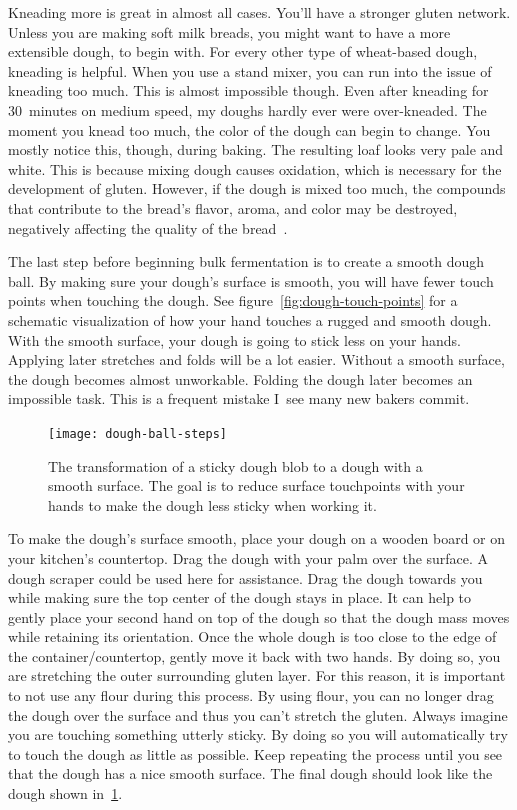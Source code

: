 Kneading more is great in almost all cases. You'll have a stronger
gluten network. Unless you are making soft milk breads, you
might want to have a more extensible dough, to begin with. For every
other type of wheat-based dough, kneading is helpful. When you use
a stand mixer, you can run into the issue of kneading too much. This
is almost impossible though. Even after kneading for 30~minutes on medium
speed, my doughs hardly ever were over-kneaded. The moment you knead
too much, the color of the dough can begin to change. You mostly
notice this, though, during baking. The resulting loaf looks very
pale and white. This is because mixing dough causes oxidation,
which is necessary for the development of gluten.
However, if the dough is mixed too much, the compounds that contribute
to the bread's flavor, aroma, and color may be destroyed, negatively
affecting the quality of the bread~\cite{oxidization+dough}.

The last step before beginning bulk fermentation is to
create a smooth dough ball. By making sure your dough's surface is
smooth, you will have fewer touch points when touching the dough.
See figure~\ref{fig:dough-touch-points} for a schematic visualization
of how your hand touches a rugged and smooth dough.
With the smooth surface, your dough is going to stick less on your hands. Applying
later stretches and folds will be a lot easier. Without a smooth
surface, the dough becomes almost unworkable. Folding the dough later
becomes an impossible task. This is a frequent mistake I~see many
new bakers commit.

\begin{figure}[!htb]
  \texttt{[image: dough-ball-steps]}
  \caption[Creating a smooth surface]{The transformation of a sticky dough
      blob to a dough with a smooth surface. The goal is to reduce surface
      touchpoints with your hands to make the dough less sticky when working
      it.}%
  \label{fig:dough-ball-steps}
\end{figure}

To make the dough's surface smooth, place your dough on a wooden board or
on your kitchen's countertop. Drag the dough with your palm over the surface.
A dough scraper could be used here for assistance.
Drag the dough towards you while making sure the top center of the dough stays in place.
It can help to gently place your second hand on top of the dough so that
the dough mass moves while retaining its orientation. Once the whole dough
is too close to the edge of the container/countertop, gently move it back
with two hands. By doing so, you are stretching the outer surrounding gluten layer.
For this reason, it is important to not use any flour during this process.
By using flour, you can no longer drag the dough over the surface and thus
you can't stretch the gluten. Always imagine you are touching something utterly sticky.
By doing so you will automatically try to touch the dough as little
as possible. Keep repeating the process until you see that the dough
has a nice smooth surface. The final dough should look like the dough
shown in~\ref{fig:dough-ball-steps}.

